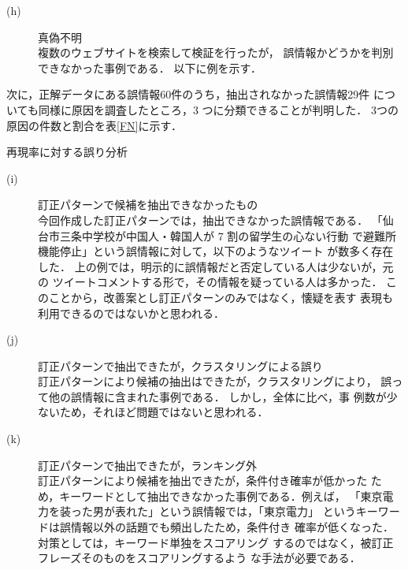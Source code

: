 \documentclass[japanese]{jnlp_1.4}
\begin{document}
\begin{description}
 \item[(h)] 真偽不明\\
	        複数のウェブサイトを検索して検証を行ったが，
	    誤情報かどうかを判別できなかった事例である．
	    以下に例を示す．
\end{description}

次に，正解データにある誤情報60件のうち，抽出されなかった誤情報29件
についても同様に原因を調査したところ，3 つに分類できることが判明した．
3つの原因の件数と割合を表\ref{FN}に示す．

\begin{table}[b]
 \caption[評価]{再現率に対する誤り分析}
 \label{FN}

\end{table}

\begin{description}
 \item[(i)] 訂正パターンで候補を抽出できなかったもの\\
	    今回作成した訂正パターンでは，抽出できなかった誤情報である．
	    「仙台市三条中学校が中国人・韓国人が 7 割の留学生の心ない行動
	    で避難所機能停止」という誤情報に対して，以下のようなツイート
	    が数多く存在した．
	上の例では，明示的に誤情報だと否定している人は少ないが，元の
	ツイートコメントする形で，その情報を疑っている人は多かった．
	このことから，改善案とし訂正パターンのみではなく，懐疑を表す
	表現も利用できるのではないかと思われる．

 \item[(j)] 訂正パターンで抽出できたが，クラスタリングによる誤り\\
	    訂正パターンにより候補の抽出はできたが，クラスタリングにより，
	    誤って他の誤情報に含まれた事例である．
	    しかし，全体に比べ，事
	    例数が少ないため，それほど問題ではないと思われる．

 \item[(k)] 訂正パターンで抽出できたが，ランキング外\\
	    訂正パターンにより候補を抽出できたが，条件付き確率が低かった
	    ため，キーワードとして抽出できなかった事例である．例えば，
	    「東京電力を装った男が表れた」という誤情報では，「東京電力」
	    というキーワードは誤情報以外の話題でも頻出したため，条件付き
	    確率が低くなった．対策としては，キーワード単独をスコアリング
	    するのではなく，被訂正フレーズそのものをスコアリングするよう
	    な手法が必要である．
\end{description}
\end{document}
